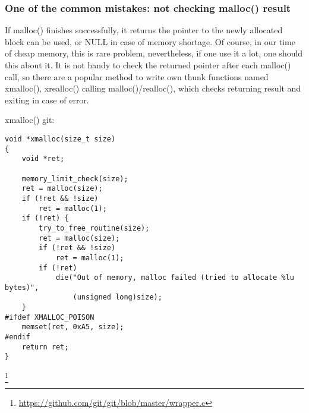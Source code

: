 
\subsubsection{
{One of the common mistakes: not checking malloc() result}}

{If malloc() finishes successfully, it returns the pointer to the newly allocated block can be used,
or NULL in case of memory shortage}.
{Of course, in our time of cheap memory, this is rare problem, nevertheless, if one use it a lot,
one should this about it}.
{It is not handy to check the returned pointer after each malloc() call, so there are a popular method
to write own thunk functions named xmalloc(), xrealloc() calling malloc()/realloc(), which checks
returning result and exiting in case of error}.

 xmalloc()  git:

\begin{lstlisting}
void *xmalloc(size_t size)
{
	void *ret;

	memory_limit_check(size);
	ret = malloc(size);
	if (!ret && !size)
		ret = malloc(1);
	if (!ret) {
		try_to_free_routine(size);
		ret = malloc(size);
		if (!ret && !size)
			ret = malloc(1);
		if (!ret)
			die("Out of memory, malloc failed (tried to allocate %lu bytes)",
			    (unsigned long)size);
	}
#ifdef XMALLOC_POISON
	memset(ret, 0xA5, size);
#endif
	return ret;
}
\end{lstlisting}
\footnote{\url{https://github.com/git/git/blob/master/wrapper.c}}

